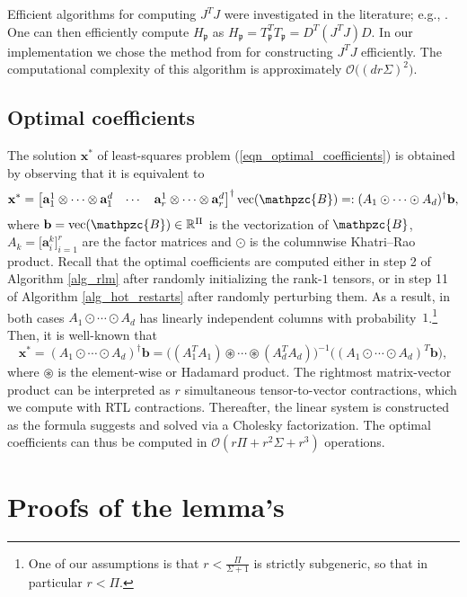 \documentclass[a4paper,10pt,final]{siamart1116}
\newcommand{\tuple}[1]{\mathfrak{#1}}
\newcommand{\tensor}[1]{\mathpzc{#1}}
\newcommand{\vect}[1]{\mathbf{#1}}
\newcommand{\sten}[3]{\vect{#1}_{#2}^{#3}}
\newcommand{\R}{\mathbb{R}}
\newcommand{\refeqn}[1]{{(\ref{#1})}}
\newcommand{\refalg}[1]{Algorithm \ref{#1}}
\numberwithin{equation}{section}
\numberwithin{figure}{section}
\numberwithin{table}{section}
\numberwithin{theorem}{section}
\begin{document}
Efficient algorithms for computing $J^T J$ were investigated in the literature; e.g., \cite{Sorber2013a,TDtB2011,Paatero1997,TomasiPhD,Phan2013a}. One can then efficiently compute $H_{\tuple{p}}$ as
\(
H_{\tuple{p}} = T_{\tuple{p}}^T T_{\tuple{p}} = D^T (J^T J) D.
\)
In our implementation we chose the method from \cite{Sorber2013a} for constructing $J^T J$ efficiently. The computational complexity of this algorithm is approximately $\mathcal{O}\bigl( (d r \Sigma)^2 \bigr)$.

\subsection{Optimal coefficients} \label{sec_optimal_coefficients}
The solution $\vect{x}^*$ of least-squares problem \refeqn{eqn_optimal_coefficients} is obtained by observing that it is equivalent to
\[
\vect{x}^* = \begin{bmatrix} \sten{a}{1}{1}\otimes\cdots\otimes\sten{a}{1}{d} & \cdots & \sten{a}{r}{1}\otimes\cdots\otimes\sten{a}{r}{d} \end{bmatrix}^\dagger \operatorname{vec}(\tensor{B}) =: (A_1 \odot \cdots \odot A_d)^\dagger \vect{b},
\]
where $\vect{b} = \operatorname{vec}(\tensor{B}) \in \R^\Pi$ is the vectorization of $\tensor{B}$, $A_k = \bigl[ \sten{a}{i}{k} \bigr]_{i=1}^r$ are the factor matrices and $\odot$ is the columnwise Khatri--Rao product.
Recall that the optimal coefficients are computed either in step {2} of \refalg{alg_rlm} after randomly initializing the rank-$1$ tensors, or in step 11 of \refalg{alg_hot_restarts} after randomly perturbing them.
As a result, in both cases $A_1 \odot \cdots \odot A_d$ has linearly independent columns with probability~$1$.\footnote{One of our assumptions is that $r < \frac{\Pi}{\Sigma+1}$ is strictly subgeneric, so that in particular $r < \Pi$.}
Then, it is well-known \cite{KB2009} that
\[
 \vect{x}^* = (A_1 \odot \cdots \odot A_d)^\dagger \vect{b} = \bigl( (A_1^T A_1) \circledast \cdots \circledast (A_d^T A_d) \bigr)^{-1} \bigl( (A_1 \odot \cdots \odot A_d)^T \vect{b} \bigr),
\]
where $\circledast$ is the element-wise or Hadamard product.
The rightmost matrix-vector product can be interpreted as $r$ simultaneous tensor-to-vector contractions, which we compute with RTL contractions. Thereafter, the linear system is constructed as the formula suggests and solved via a Cholesky factorization. The optimal coefficients can thus be computed in $\mathcal{O}(r\Pi + r^2 \Sigma + r^3)$ operations.


\section{Proofs of the lemma's}\label{app_proof_sthosvd_retraction}
\end{document}
